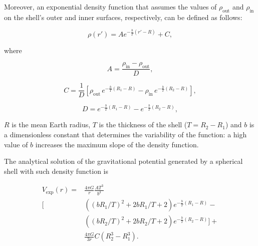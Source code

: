\documentclass[extra, referee]{gji}
\begin{document}
Moreover, an exponential density function that assumes the values of $\rho_\text{out}$
and $\rho_\text{in}$ on the shell's outer and inner surfaces, respectively, can be
defined as follows:

\begin{equation}
    \rho(r') = A e^{- \frac{b}{T} (r' - R)} + C,
\end{equation}

\noindent where

\begin{equation}
    A = \frac{\rho_\text{in} - \rho_\text{out}}{D},
\end{equation}

\begin{equation}
    C = \frac{1}{D}
    \left[\rho_\text{out} \, e^{- \frac{b}{T} (R_1 - R)} -
    \rho_\text{in} \, e^{- \frac{b}{T} (R_2 - R)} \right],
\end{equation}

\begin{equation}
    D = e^{- \frac{b}{T} (R_1 - R)} - e^{- \frac{b}{T} (R_2 - R)},
\end{equation}

\noindent $R$ is the mean Earth radius, $T$ is the thickness of the shell ($T = R_2
- R_1$) and $b$ is a dimensionless constant that determines the variability of the
function: a high value of $b$ increases the maximum slope of the density function.

The analytical solution of the gravitational potential generated by a
spherical shell with such density function is

\begin{equation}
    \begin{split}
        V_\text{exp}(r) = & \frac{4\pi G}{r} \frac{A T^3}{b^3} \\ \Big[
        & \left( \left( b R_1/T \right)^2 + 2 b R_1/T + 2 \right)
        e^{- \frac{b}{T} (R_1 - R)} - \\
        & \left( \left( b R_2/T \right)^2 + 2 b R_2/T + 2 \right)
        e^{- \frac{b}{T} (R_2 - R)}
        \Big] + \\
        & \frac{4\pi G}{3 r} C \left( R_2^3 - R_1^3 \right).
    \end{split}
\label{eq:shell-pot-exp}
\end{equation}
\end{document}
